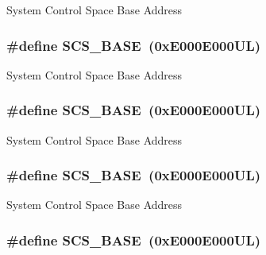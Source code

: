 System Control Space Base Address \hypertarget{group___c_m_s_i_s__core__base_ga3c14ed93192c8d9143322bbf77ebf770}{
\subsubsection[{S\-C\-S\-\_\-\-B\-A\-S\-E}]{\setlength{\rightskip}{0pt plus 5cm}\#define S\-C\-S\-\_\-\-B\-A\-S\-E~(0x\-E000\-E000\-U\-L)}}\label{group___c_m_s_i_s__core__base_ga3c14ed93192c8d9143322bbf77ebf770}
System Control Space Base Address \hypertarget{group___c_m_s_i_s__core__base_ga3c14ed93192c8d9143322bbf77ebf770}{
\subsubsection[{S\-C\-S\-\_\-\-B\-A\-S\-E}]{\setlength{\rightskip}{0pt plus 5cm}\#define S\-C\-S\-\_\-\-B\-A\-S\-E~(0x\-E000\-E000\-U\-L)}}\label{group___c_m_s_i_s__core__base_ga3c14ed93192c8d9143322bbf77ebf770}
System Control Space Base Address \hypertarget{group___c_m_s_i_s__core__base_ga3c14ed93192c8d9143322bbf77ebf770}{
\subsubsection[{S\-C\-S\-\_\-\-B\-A\-S\-E}]{\setlength{\rightskip}{0pt plus 5cm}\#define S\-C\-S\-\_\-\-B\-A\-S\-E~(0x\-E000\-E000\-U\-L)}}\label{group___c_m_s_i_s__core__base_ga3c14ed93192c8d9143322bbf77ebf770}
System Control Space Base Address \hypertarget{group___c_m_s_i_s__core__base_ga3c14ed93192c8d9143322bbf77ebf770}{
\subsubsection[{S\-C\-S\-\_\-\-B\-A\-S\-E}]{\setlength{\rightskip}{0pt plus 5cm}\#define S\-C\-S\-\_\-\-B\-A\-S\-E~(0x\-E000\-E000\-U\-L)}}\label{group___c_m_s_i_s__core__base_ga3c14ed93192c8d9143322bbf77ebf770}
